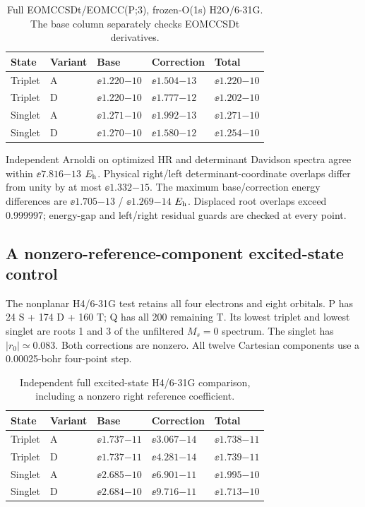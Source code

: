 \begin{table}[htbp]\centering\small
\begin{tabular}{lllll}
\toprule
State & Variant & Base & Correction & Total\\
\midrule
Triplet & A & $\ee{1.220}{-10}$ & $\ee{1.504}{-13}$ & $\ee{1.220}{-10}$\\
Triplet & D & $\ee{1.220}{-10}$ & $\ee{1.777}{-12}$ & $\ee{1.202}{-10}$\\
Singlet & A & $\ee{1.271}{-10}$ & $\ee{1.992}{-13}$ & $\ee{1.271}{-10}$\\
Singlet & D & $\ee{1.270}{-10}$ & $\ee{1.580}{-12}$ & $\ee{1.254}{-10}$\\
\bottomrule
\end{tabular}
\caption{Full EOMCCSDt/EOMCC(P;3), frozen-O(1s) H2O/6-31G. The base column separately checks EOMCCSDt derivatives.}\label{tab:waterexcited}
\end{table}

Independent Arnoldi on optimized HR and determinant Davidson spectra agree within $\ee{7.816}{-13}$ $E_{\mathrm h}$.
Physical right/left determinant-coordinate overlaps differ from unity by at most $\ee{1.332}{-15}$.
The maximum base/correction energy differences are $\ee{1.705}{-13}$ / $\ee{1.269}{-14}$ $E_{\mathrm h}$.
Displaced root overlaps exceed 0.999997; energy-gap and left/right residual guards are checked at every point.

\subsection{A nonzero-reference-component excited-state control}
The nonplanar H4/6-31G test retains all four electrons and eight orbitals.
P has 24 S + 174 D + 160 T; Q has all 200 remaining T. Its lowest triplet
and lowest singlet are roots 1 and 3 of the unfiltered $M_s=0$ spectrum.
The singlet has $|r_0|\simeq0.083$. Both corrections are nonzero.
All twelve Cartesian components use a 0.00025-bohr four-point step.

\begin{table}[htbp]\centering\small
\begin{tabular}{lllll}
\toprule
State & Variant & Base & Correction & Total\\
\midrule
Triplet & A & $\ee{1.737}{-11}$ & $\ee{3.067}{-14}$ & $\ee{1.738}{-11}$\\
Triplet & D & $\ee{1.737}{-11}$ & $\ee{4.281}{-14}$ & $\ee{1.739}{-11}$\\
Singlet & A & $\ee{2.685}{-10}$ & $\ee{6.901}{-11}$ & $\ee{1.995}{-10}$\\
Singlet & D & $\ee{2.684}{-10}$ & $\ee{9.716}{-11}$ & $\ee{1.713}{-10}$\\
\bottomrule
\end{tabular}
\caption{Independent full excited-state H4/6-31G comparison, including a nonzero right reference coefficient.}\label{tab:h4excited}
\end{table}

